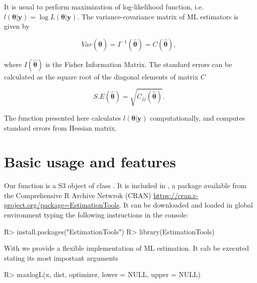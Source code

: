 \documentclass[nojss]{jss}
\begin{document}
It is usual to perform maximization of log-likelihood function, i.e. $l(\boldsymbol{\theta}|\bm{y})=\log L(\boldsymbol{\theta}|\bm{y})$. The variance-covariance matrix of ML estimators is given by

\begin{equation}
Var(\hat{\boldsymbol{\theta}}) = I^{-1}(\hat{\boldsymbol{\theta}}) = C(\hat{\boldsymbol{\theta}}),
\end{equation}

where $I(\hat{\boldsymbol{\theta}})$ is the Fisher Information Matrix. The standard errors can be calculated as the square root of the diagonal elements of matrix $C$ \citep{Pawitan2013}%

\begin{equation}
S.E(\hat{\boldsymbol{\theta}}) = \sqrt{C_{jj}(\hat{\boldsymbol{\theta}})}.
\end{equation}

The  function presented here calculates $l(\boldsymbol{\theta}|\bm{y})$ computationally, and computes standard errors from Hessian matrix.

\section{Basic usage and features}

Our  function is a S3 object of class . It is included in , a package available from the Comprehensive R Archive Netwrok (CRAN) \url{https://cran.r-project.org/package=EstimationTools}. It can be downloaded and loaded in global environment typing the following instructions in the console:

\begin{Schunk}
\begin{Sinput}
R> install.packages("EstimationTools")
R> library(EstimationTools)
\end{Sinput}
\end{Schunk}

With  we provide a flexible implementation of ML estimation. It cab be executed stating its most important arguments

\begin{Schunk}
\begin{Sinput}
R> maxlogL(x, dist, optimizer, lower = NULL, upper = NULL)
\end{Sinput}
\end{Schunk}
\end{document}
